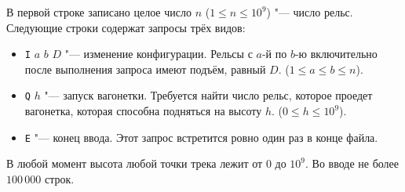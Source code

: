 В первой строке записано целое число $n$ ($1 \le n \le 10^9$) "--- число
рельс. Следующие строки содержат запросы трёх видов:
\begin{itemize}
  \item \texttt{I} $a$ $b$ $D$ "--- изменение конфигурации. Рельсы с $a$-й по $b$-ю
    включительно после выполнения запроса имеют подъём, равный $D$. ($1 \le a \le b \le n$).
  \item \texttt{Q} $h$ "--- запуск вагонетки. Требуется найти число рельс, которое
    проедет вагонетка, которая способна подняться на высоту $h$. ($0 \le h \le 10^9$).
  \item \texttt{E} "--- конец ввода. Этот запрос встретится ровно один раз в конце
    файла.
\end{itemize}

В любой момент высота любой точки трека лежит от $0$ до $10^9$. Во вводе не
более $100\,000$ строк.

